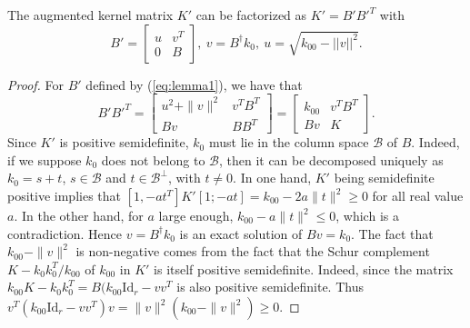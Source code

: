 \begin{lemma} The augmented kernel matrix $K'$ can be factorized as $K'= B'B'^T$ with
\begin{equation}
B'=\begin{bmatrix}
u & v^T\\0 & B
\end{bmatrix},~
v = B^\dagger k_0,~ u=\sqrt{k_{00}-||v||^2}.
\label{eq:lemma1}
\end{equation}
\end{lemma}\label{lemma1}
\begin{proof}
For $B'$ defined by (\ref{eq:lemma1}), we have that
\begin{equation}
B'B'^T = 
\begin{bmatrix} u^2+\|v\|^2 & v^TB^T\\ 
Bv& BB^T\end{bmatrix} 
=\begin{bmatrix} k_{00} & v^TB^T\\ 
Bv& K\end{bmatrix} .
\end{equation}
Since $K'$ is positive semidefinite, $k_0$ must lie in the column space $\mathcal{B}$ of $B$.
Indeed, if we suppose $k_0$ does not belong to $\mathcal{B}$, then it can be decomposed uniquely as $k_0=s+t$, $s\in\mathcal{B}$ and  $t\in\mathcal{B}^\perp$, with $t\ne 0$. In one hand, $K'$ being semidefinite positive implies that $[1, -at^T]K'[1; -at]=k_{00}-2a\|t\|^2\ge 0$ for all real value $a$. In the other hand, for $a$ large enough, $k_{00}-a\|t\|^2\le 0$, which is a contradiction.
Hence $v=B^\dagger k_0$ is an exact solution of $Bv=k_0$. The fact that $k_{00}-\|v\|^2$ is non-negative comes from the fact that the Schur complement $K-k_0 k_0^T / k_{00}$ of $k_{00}$ in $K'$ is itself positive semidefinite.
Indeed, since the matrix $k_{00}K-k_0k_0^T=B(k_{00}\mathrm{Id}_r-vv^T$ is also positive semidefinite. Thus $v^T(k_{00}\mathrm{Id}_r-vv^T)v = \|v\|^2(k_{00}-\|v\|^2)\ge 0$. \qedhere
\end{proof}


